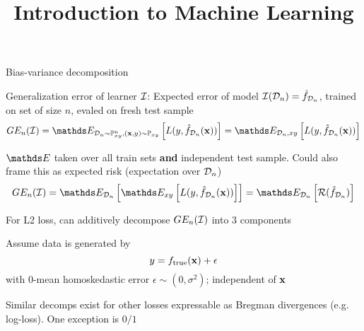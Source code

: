 \documentclass[11pt,compress,t,notes=noshow, xcolor=table]{beamer}
\title{Introduction to Machine Learning}
\begin{document}
    

\begin{framei}[sep=M]{Bias-variance decomposition}

\item Generalization error of learner  $\mathcal{I}$: 
Expected error of model $\mathcal{I}(\mathcal{D}_n) = \hat{f}_{\mathcal{D}_n}$, trained on set of size $n$, evaled on fresh test sample
$$
GE_n(\ind) = \E_{\D_n \sim \Pxy^n, (\xv, y) \sim \Pxy}\left[ L(y, \fh_{\D_n}(\xv)) \right] = \E_{\D_n, xy}\left[L(y, \fh_{\D_n}(\xv)) \right]  
$$

\item $\E$ taken over all train sets \textbf{and} independent test sample. Could also frame this as expected risk (expectation over $\mathcal{D}_n$)
$$GE_n(\ind) = \E_{\D_n}\left[\E_{xy}\left[ L(y, \fh_{\D_n}(\xv))\right]\right] =  \E_{\D_n}\left[\risk(\fh_{\D_n})\right]$$

\item For L2 loss, can additively decompose  $GE_n(\mathcal{I})$ into 3 components

\item Assume data is generated by 
$$
y = f_{\text{true}}(\mathbf{x}) + \epsilon
$$
with 0-mean homoskedastic error $\epsilon \sim (0, \sigma^2)$; independent of $\mathbf{x}$

\item Similar decomps exist for other losses expressable as Bregman divergences (e.g. log-loss). One exception is $0/1$ 

\end{framei}
\end{document}
